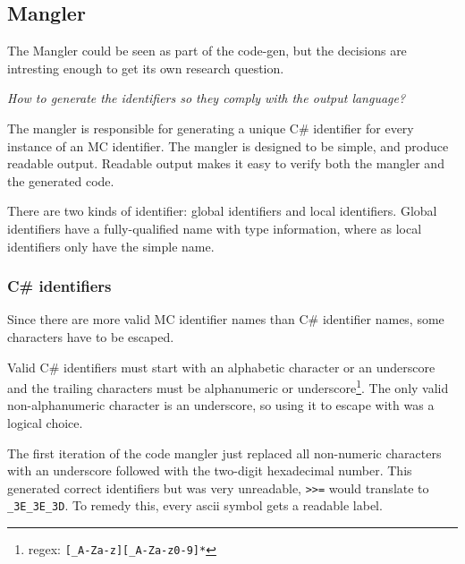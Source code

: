 \subsection{Mangler}
The Mangler could be seen as part of the code-gen, but the decisions are intresting enough to get its own research question.

\textit{How to generate the identifiers so they comply with the output language?}

The mangler is responsible for generating a unique C\# identifier for every instance of an MC identifier.
The mangler is designed to be simple, and produce readable output.
Readable output makes it easy to verify both the mangler and the generated code.

There are two kinds of identifier: global identifiers and local identifiers.
Global identifiers have a fully-qualified name with type information, where as local identifiers only have the simple name.

\subsubsection{C\# identifiers}
Since there are more valid MC identifier names than C\# identifier names, some characters have to be escaped.

Valid C\# identifiers must start with an alphabetic character or an underscore and the trailing characters must be alphanumeric or underscore\footnote{regex: \texttt{[\_A-Za-z][\_A-Za-z0-9]*}}\cite{msdn_identifiers}.
The only valid non-alphanumeric character is an underscore, so using it to escape with was a logical choice.

The first iteration of the code mangler just replaced all non-numeric characters with an underscore followed with the two-digit hexadecimal number.
This generated correct identifiers but was very unreadable, \verb|>>=| would translate to \verb|_3E_3E_3D|.
To remedy this, every ascii symbol gets a readable label.


